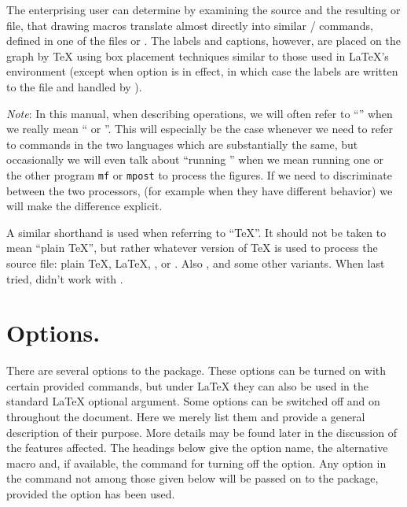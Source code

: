 \documentclass[letterpaper]{article}
\begin{document}
The enterprising user can determine by examining the \mfp{} source and
the resulting  or  file, that \mfp{} drawing macros
translate almost directly into similar \MF{}\slash\MP{} commands,
defined in one of the files  or .
The labels and captions, however, are placed on the graph by \TeX{}
using box placement techniques similar to those used in \LaTeX{}'s
 environment (except when option  is in
effect, in which case the labels are written to the  file and
handled by \MP{}).

\smallskip
\emph{Note}: In this manual, when describing \mfp{} operations, we will
often refer to ``\MF{}'' when we really mean ``\MF{} or \MP{}''. This
will especially be the case whenever we need to refer to commands in the
two languages which are substantially the same, but occasionally we will
even talk about ``running \MF{}'' when we mean running one or the other
program \texttt{mf} or \texttt{mpost} to process the figures. If we need
to discriminate between the two processors, (for example when they have
different behavior) we will make the difference explicit.

A similar shorthand is used when referring to ``\TeX{}''. It should not be
taken to mean ``plain \TeX{}'', but rather whatever version of \TeX{} is used
to process the source file: plain \TeX{}, \LaTeX{}, \pdfTeX{}, or
\pdfLaTeX{}. Also \AmSTeX{},  and some other variants. When
last tried, \mfp{} didn't work with \ConTeXt{}.

\clearpage
\chapter{Options.}\label{options}

There are several options to the \mfp{} package. These options can be
turned on with certain provided commands, but under \LaTeX{} they can
also be used in the standard \LaTeX{}  optional argument.
Some options can be switched off and on throughout the document. Here we
merely list them and provide a general description of their purpose.
More details may be found later in the discussion of the features
affected. The headings below give the option name, the alternative macro
and, if available, the command for turning off the option. Any option
in the  command not among those given below will be
passed on to the  package, provided the 
option has been used.
\end{document}
